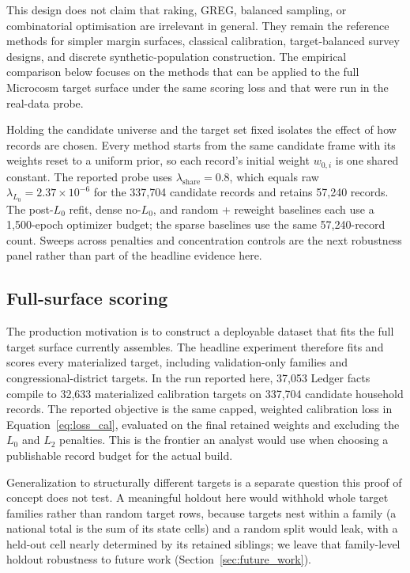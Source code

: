 This design does not claim that raking, GREG, balanced sampling, or combinatorial optimisation are
irrelevant in general. They remain the reference methods for simpler margin surfaces, classical
calibration, target-balanced survey designs, and discrete synthetic-population construction. The
empirical comparison below focuses on the methods that can be applied to the full Microcosm target
surface under the same scoring loss and that were run in the real-data probe.

Holding the candidate universe and the target set fixed isolates the effect of how records are
chosen. Every method starts from the same candidate frame with its weights reset to a uniform prior, so
each record's initial weight $w_{0,i}$ is one shared constant. The reported probe uses
$\lambda_{\mathrm{share}}=0.8$, which equals raw $\lambda_{L_0}=2.37\times10^{-6}$ for the 337{,}704
candidate records and retains 57{,}240 records. The post-$L_0$ refit, dense no-$L_0$, and random +
reweight baselines each use a 1{,}500-epoch optimizer budget; the sparse baselines use the same
57{,}240-record count. Sweeps across penalties and concentration controls are the next
robustness panel rather than part of the headline evidence here.

\subsection{Full-surface scoring}
\label{sec:oos}

The production motivation is to construct a deployable dataset that fits the full target surface 
\microcosm{} currently assembles. The headline experiment therefore fits and scores every materialized 
target, including validation-only families and congressional-district targets. In the run reported here, 
37{,}053 Ledger facts compile to 32{,}633 materialized calibration targets on 337{,}704 candidate 
household records. The reported objective is the same capped, weighted calibration loss in 
Equation~\ref{eq:loss_cal}, evaluated on the final retained weights and excluding the $L_0$ and $L_2$ 
penalties. This is the frontier an analyst would use when choosing a publishable record budget for 
the actual \microcosm{} build.

Generalization to structurally different targets is a separate question this proof of concept does not
test. A meaningful holdout here would withhold whole target families rather than random target rows,
because targets nest within a family (a national total is the sum of its state cells) and a random split
would leak, with a held-out cell nearly determined by its retained siblings; we leave that family-level
holdout robustness to future work (Section~\ref{sec:future_work}).

